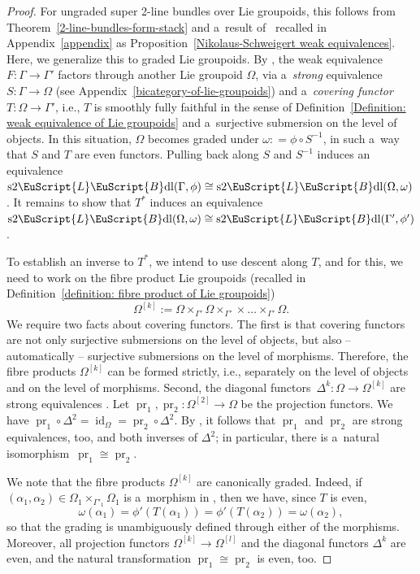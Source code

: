 \documentclass[10pt,a4paper]{amsart}
\numberwithin{equation}{section}
\def\mathscr#1{\EuScript{#1}}
\newcommand{\pr}{\operatorname{pr}}
\newcommand{\id}{\operatorname{id}}
\newcommand{\LineBdl}{\mathscr{L}\mathscr{B}\mathrm{dl}}
\newcommand{\stwoLineBdl}{\mathrm{s}2\LineBdl}
\begin{document}
\begin{proof}
For ungraded super 2-line bundles over Lie groupoids, this follows from Theorem~\ref{2-line-bundles-form-stack} and a~result of~\cite{nikolaus2} recalled in Appendix~\ref{appendix} as Proposition~\ref{Nikolaus-Schweigert weak equivalences}. Here, we generalize this to graded Lie groupoids.
By \cite[Proposition~5.7]{nikolaus2}, the weak equivalence $F\colon \Gamma \to \Gamma'$ factors through another Lie groupoid $\Omega$, via a~\emph{strong} equivalence $S\colon \Gamma \to \Omega$ (see Appendix~\ref{bicategory-of-lie-groupoids}) and a~\emph{covering functor} $T\colon \Omega \to \Gamma'$, i.e., $T$ is smoothly fully faithful in the sense of Definition~\ref{Definition: weak equivalence of Lie groupoids} and a~surjective submersion on the level of objects. In this situation, $\Omega$ becomes graded under $\omega: =\phi \circ S^{-1}$, in such a~way that $S$ and $T$ are even functors. Pulling back along $S$ and $S^{-1}$ induces an equivalence $\stwoLineBdl(\Gamma, \phi) \cong \stwoLineBdl(\Omega,\omega)$. It remains to show that $T^{*}$ induces an equivalence~${\stwoLineBdl(\Omega,\omega)\cong \stwoLineBdl(\Gamma',\phi')}$.




To establish an inverse to $T^{*}$, we intend to use descent along $T$, and for this, we need to work on the fibre product Lie groupoids (recalled in Definition~\ref{definition: fibre product of Lie groupoids})
\begin{equation*}
\Omega^{[k]} := \Omega \times_{\Gamma'} \Omega \times_{\Gamma'} \times\dots\times_{\Gamma'} \Omega.
\end{equation*}
We require two
facts about covering functors. The first is that covering functors are not only surjective submersions on the level of objects, but also -- automatically -- surjective submersions on the level of morphisms. Therefore, the fibre products $\Omega^{[k]}$ can be formed strictly, i.e., separately on the level of objects and on the level of morphisms. Second, the diagonal functors~${
\Delta^{k}\colon \Omega \to \Omega^{[k]}}
$
are strong equivalences \cite[Lemma~8.1\,(ii)]{nikolaus2}. Let $\pr_1,\pr_2\colon \Omega^{[2]} \to \Omega$ be the projection functors. We have $\pr_1\circ\Delta^2 = \id_{\Omega} = \pr_2\circ \Delta^2$. By \cite[Lemma~5.3]{nikolaus2}, it follows that $\pr_1$ and $\pr_2$ are strong equivalences, too, and both inverses of $\Delta^2$; in particular, there is a~natural isomorphism~${\pr_1\cong \pr_2}$.

We note that the fibre products $\Omega^{[k]}$ are canonically graded. Indeed, if $(\alpha_1,\alpha_2)\in \Omega_1 \times_{\Gamma'_1}\Omega_1$ is a~morphism in \smash{$\Omega^{[2]}$}, then we have, since $T$ is even,
\begin{equation*}
\omega(\alpha_1) = \phi'(T(\alpha_1))=\phi'(T(\alpha_2))=\omega(\alpha_2),
\end{equation*}
so that the grading is unambiguously defined through either of the morphisms. Moreover, all projection functors $\Omega^{[k]} \to \Omega^{[l]}$ and the diagonal functors $\Delta^{k}$ are even, and the natural transformation $\pr_1\cong \pr_2$ is even, too.


\end{proof}
\end{document}
